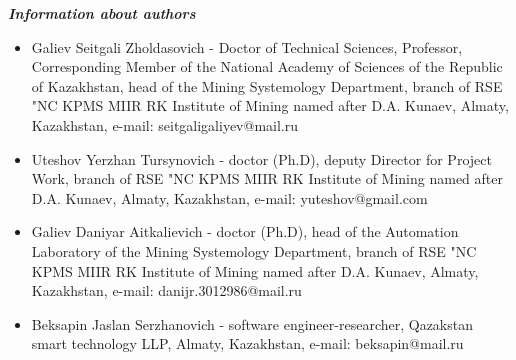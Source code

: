 \begin{center}
\emph{{\bfseries Information about authors}}
\end{center}

\begin{itemize}
\item
Galiev Seitgali Zholdasovich - Doctor of Technical Sciences, Professor,
Corresponding Member of the National Academy of Sciences of the Republic
of Kazakhstan, head of the Mining Systemology Department, branch of RSE
"NC KPMS MIIR RK Institute of Mining named after D.A. Kunaev, Almaty,
Kazakhstan, e-mail:
seitgaligaliyev@mail.ru

\item
Uteshov Yerzhan Tursynovich - doctor (Ph.D), deputy Director for
Project Work, branch of RSE "NC KPMS MIIR RK Institute of Mining named
after D.A. Kunaev, Almaty, Kazakhstan, e-mail:
yuteshov@gmail.com

\item
Galiev Daniyar Aitkalievich - doctor (Ph.D), head of the Automation
Laboratory of the Mining Systemology Department, branch of RSE "NC KPMS
MIIR RK Institute of Mining named after D.A. Kunaev, Almaty, Kazakhstan,
e-mail:
danijr.3012986@mail.ru

\item
Beksapin Jaslan Serzhanovich - software engineer-researcher, Qazakstan
smart technology LLP, Almaty, Kazakhstan, e-mail: beksapin@mail.ru
\end{itemize}

